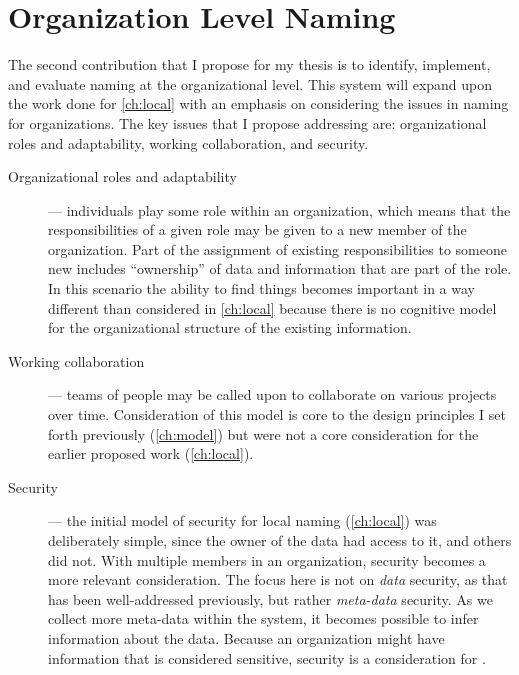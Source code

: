 \chapter{Organization Level Naming}
\label{ch:organization}

The second contribution that I propose for my thesis is to identify,
implement, and evaluate naming at the organizational level.  This system will
expand upon the work done for \autoref{ch:local} with an emphasis on considering
the issues in naming for organizations.  The key issues that I propose
addressing are: organizational roles and adaptability, working collaboration,
and security.

\begin{description}
    \item[Organizational roles and adaptability] --- individuals play some role within an
        organization, which means that the responsibilities of a given role may be
        given to a new member of the organization.  Part of the assignment of
        existing responsibilities to someone new includes ``ownership'' of data and
        information that are part of the role.  In this scenario the ability to find
        things becomes important in a way different than considered in
        \autoref{ch:local} because there is no cognitive model for the
        organizational structure of the existing information.

    \item[Working collaboration] --- teams of people may be called upon to
        collaborate on various projects over time.  Consideration of this model is
        core to the design principles I set forth previously (\autoref{ch:model})
        but were not a core consideration for the earlier proposed work
        (\autoref{ch:local}).

    \item[Security] --- the initial model of security for local naming
        (\autoref{ch:local}) was deliberately simple, since the owner of the data
        had access to it, and others did not.  With multiple members in an
        organization, security becomes a more relevant consideration. The focus here
        is not on \emph{data} security, as that has been well-addressed previously,
        but rather \emph{meta-data} security.  As we collect more meta-data within
        the system, it becomes possible to infer information about the data. Because
        an organization might have information that is considered sensitive,
        security is a consideration for \system.
\end{description}


